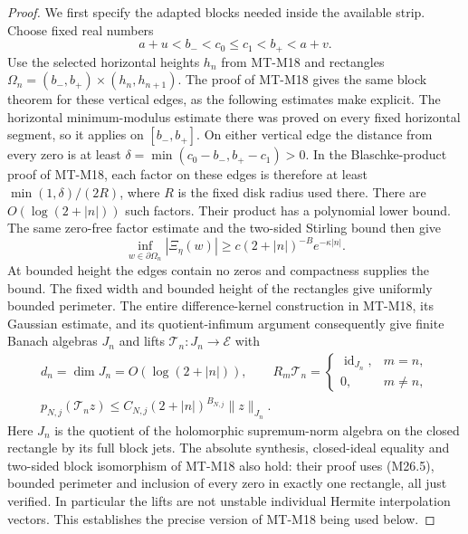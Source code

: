 \documentclass[11pt,a4paper]{article}
\begin{document}
\begin{proof}
We first specify the adapted blocks needed inside the available
strip. Choose fixed real numbers
\[
        a+u<b_-<c_0\le c_1<b_+<a+v.
\]
Use the selected horizontal heights $h_n$ from MT-M18 and
rectangles $\Omega_n=(b_-,b_+)\times(h_n,h_{n+1})$.
The proof of MT-M18 gives the same block theorem for these
vertical edges, as the following estimates make explicit.
The horizontal minimum-modulus estimate there was proved
on every fixed horizontal segment, so it applies on
$[b_-,b_+]$. On either vertical edge the distance from every
zero is at least
$\delta=\min(c_0-b_-,b_+-c_1)>0$.
In the Blaschke-product proof of MT-M18, each factor on these
edges is therefore at least
$\min(1,\delta)/(2R)$, where $R$ is the fixed disk radius
used there. There are $O(\log(2+|n|))$ such factors.
Their product has a polynomial lower bound. The same
zero-free factor estimate and the two-sided Stirling bound
then give
\[
 \inf_{w\in\partial\Omega_n}|\Xi_\eta(w)|
    \ge c(2+|n|)^{-B}e^{-\kappa|n|}.
                                                               \tag{M26.5}
\]
At bounded height the edges contain no zeros and compactness
supplies the bound. The fixed width and bounded height of the
rectangles give uniformly bounded perimeter. The entire
difference-kernel construction in MT-M18, its Gaussian estimate,
and its quotient-infimum argument consequently give finite
Banach algebras $J_n$ and lifts $\mathcal T_n:J_n\to\mathcal E$
with
\[
 \begin{gathered}
 d_n=\dim J_n=O(\log(2+|n|)),\qquad
 R_m\mathcal T_n=\begin{cases}\operatorname{id}_{J_n},&m=n,\\0,&m\ne n,
                         \end{cases}\\
 p_{N,j}(\mathcal T_n z)
       \le C_{N,j}(2+|n|)^{B_{N,j}}\|z\|_{J_n}.
 \end{gathered}                                                 \tag{M26.6}
\]
Here $J_n$ is the quotient of the holomorphic supremum-norm
algebra on the closed rectangle by its full block jets.
The absolute synthesis, closed-ideal equality and two-sided
block isomorphism of MT-M18 also hold: their proof uses
(M26.5), bounded perimeter and inclusion of every zero in
exactly one rectangle, all just verified. In particular the
lifts are not unstable individual Hermite interpolation
vectors. This establishes the precise version of MT-M18
being used below.


\end{proof}
\end{document}

